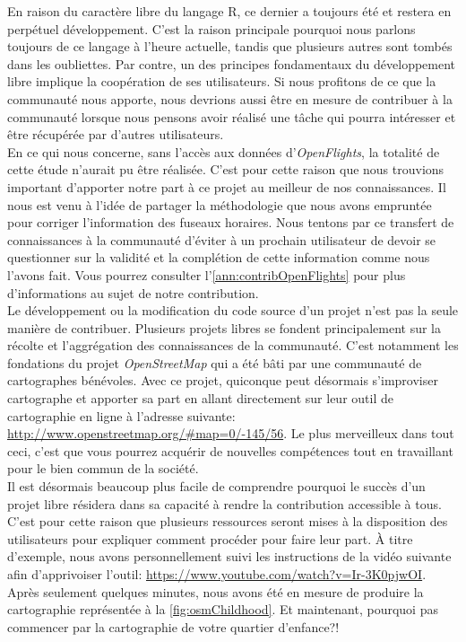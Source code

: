 
En raison du caractère libre du langage R, ce dernier a toujours été et restera en perpétuel développement. C'est la raison principale pourquoi nous parlons toujours de ce langage à l'heure actuelle, tandis que plusieurs autres sont tombés dans les oubliettes. Par contre, un des principes fondamentaux du développement libre implique la coopération de ses utilisateurs. Si nous profitons de ce que la communauté nous apporte, nous devrions aussi être en mesure de contribuer à la communauté lorsque nous pensons avoir réalisé une tâche qui pourra intéresser et être récupérée par d'autres utilisateurs. \\

En ce qui nous concerne, sans l'accès aux données d'\emph{OpenFlights}, la totalité de cette étude n'aurait pu être réalisée. C'est pour cette raison que nous trouvions important d'apporter notre part à ce projet au meilleur de nos connaissances. Il nous est venu à l'idée de partager la méthodologie que nous avons empruntée pour corriger l'information des fuseaux horaires. Nous tentons par ce transfert de connaissances à la communauté d'éviter à un prochain utilisateur de devoir se questionner sur la validité et la complétion de cette information comme nous l'avons fait. Vous pourrez consulter l'\autoref{ann:contribOpenFlights} pour plus d'informations au sujet de notre contribution. \\

Le développement ou la modification du code source d'un projet n'est pas la seule manière de contribuer. Plusieurs projets libres se fondent principalement sur la récolte et l'aggrégation des connaissances de la communauté. C'est notamment les fondations du projet \emph{OpenStreetMap} qui a été bâti par une communauté de cartographes bénévoles. Avec ce projet, quiconque peut désormais s'improviser cartographe et apporter sa part en allant directement sur leur outil de cartographie en ligne à l'adresse suivante: \url{http://www.openstreetmap.org/#map=0/-145/56}. Le plus merveilleux dans tout ceci, c'est que vous pourrez acquérir de nouvelles compétences tout en travaillant pour le bien commun de la société. \\

Il est désormais beaucoup plus facile de comprendre pourquoi le succès d'un projet libre résidera dans sa capacité à rendre la contribution accessible à tous. C'est pour cette raison que plusieurs ressources seront mises à la disposition des utilisateurs pour expliquer comment procéder pour faire leur part. À titre d'exemple, nous avons personnellement suivi les instructions de la vidéo suivante afin d'apprivoiser l'outil: \url{https://www.youtube.com/watch?v=Ir-3K0pjwOI}. Après seulement quelques minutes, nous avons été en mesure de produire la cartographie représentée à la \autoref{fig:osmChildhood}. Et maintenant, pourquoi pas commencer par la cartographie de votre quartier d'enfance?! \\

